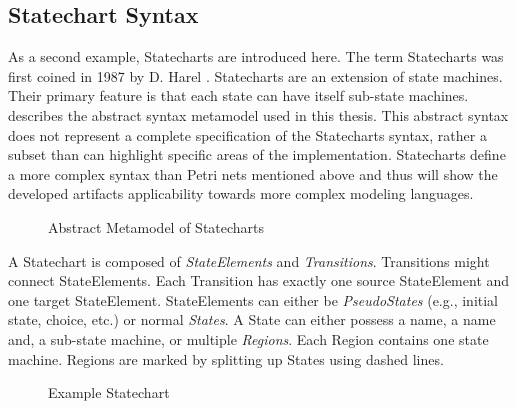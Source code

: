 \subsection{Statechart Syntax}
\label{sec:statecharts}
As a second example, Statecharts are introduced here. The term Statecharts was first coined in 1987 by D. Harel \cite{harel_statecharts_1987}. Statecharts are an extension of state machines. Their primary feature is that each state can have itself sub-state machines.  describes the abstract syntax metamodel used in this thesis. This abstract syntax does not represent a complete specification of the Statecharts syntax, rather a subset than can highlight specific areas of the implementation. Statecharts define a more complex syntax than Petri nets mentioned above and thus will show the developed artifacts applicability towards more complex modeling languages.

\begin{figure}
\centering

\caption{Abstract Metamodel of Statecharts}
\label{fig:statechartmm}
\end{figure}


A Statechart is composed of \emph{StateElements} and \emph{Transitions}. Transitions might connect StateElements. Each Transition has exactly one source StateElement and one target StateElement. StateElements can either be \emph{PseudoStates} (e.g., initial state, choice, etc.) or normal \emph{States}. A State can either possess a name, a name and, a sub-state machine, or multiple \emph{Regions}. Each Region contains one state machine. Regions are marked by splitting up States using dashed lines. 


\begin{figure}
\centering

\caption{Example Statechart}
\label{fig:state-example}
\end{figure}




